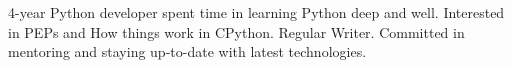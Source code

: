 
4-year Python developer spent time in learning Python deep and well. Interested in PEPs and How things work in CPython. Regular Writer. Committed in mentoring and staying up-to-date with latest technologies.